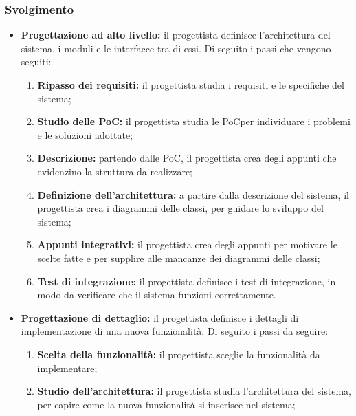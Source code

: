 \subsubsection{Svolgimento}
\begin{itemize}
	\item \textbf{Progettazione ad alto livello:} il progettista definisce
	      l'architettura del sistema, i moduli e le interfacce tra di essi. Di
	      seguito i passi che vengono seguiti:
	      \begin{enumerate}
		      \item \textbf{Ripasso dei requisiti:} il progettista studia i
		            requisiti e le specifiche del sistema;

		      \item \textbf{Studio delle PoC\g:} il progettista studia le PoC\g per
		            individuare i problemi e le soluzioni adottate;

		      \item \textbf{Descrizione:} partendo dalle PoC\g, il progettista
		            crea degli appunti che evidenzino la struttura da
		            realizzare;

		      \item \textbf{Definizione dell'architettura:} a partire dalla
		            descrizione del sistema, il progettista crea i diagrammi
		            delle classi, per guidare lo sviluppo del sistema;

		      \item \textbf{Appunti integrativi:} il progettista
		            crea degli appunti per motivare le scelte fatte e per
		            supplire alle mancanze dei diagrammi delle classi;

		      \item \textbf{Test di integrazione:} il progettista definisce i
		            test di integrazione, in modo da verificare che il sistema
		            funzioni correttamente.
	      \end{enumerate}

	\item \textbf{Progettazione di dettaglio:} il progettista definisce i
	      dettagli di implementazione di una nuova funzionalità. Di seguito i
	      passi da seguire:
	      \begin{enumerate}
		      \item \textbf{Scelta della funzionalità:} il progettista
		            sceglie la funzionalità da implementare;

		      \item \textbf{Studio dell'architettura:} il progettista
		            studia l'architettura del sistema, per capire come
		            la nuova funzionalità si inserisce nel sistema;


\end{enumerate}
\end{itemize}
